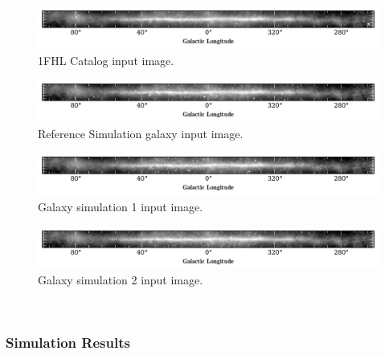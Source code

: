 \documentclass{PoS}
\begin{document}
\begin{figure}
  \begin{center}
      \includegraphics[width=\textwidth]{figures/1FHL.pdf}
  \caption{1FHL Catalog input image.}
  \end{center}
\end{figure}

\begin{figure}
  \begin{center}
      \includegraphics[width=\textwidth]{figures/SIM1.pdf}
  \caption{Reference Simulation galaxy input image.}
  \end{center}
\end{figure}

\begin{figure}
  \begin{center}
      \includegraphics[width=\textwidth]{figures/SIM2.pdf}
  \caption{Galaxy simulation 1 input image.}
  \end{center}
\end{figure}

\begin{figure}
  \begin{center}
      \includegraphics[width=\textwidth]{figures/SIM3.pdf}
  \caption{Galaxy simulation 2 input image.}
  \end{center}
\end{figure}
\\


\subsubsection{Simulation Results}
\end{document}
